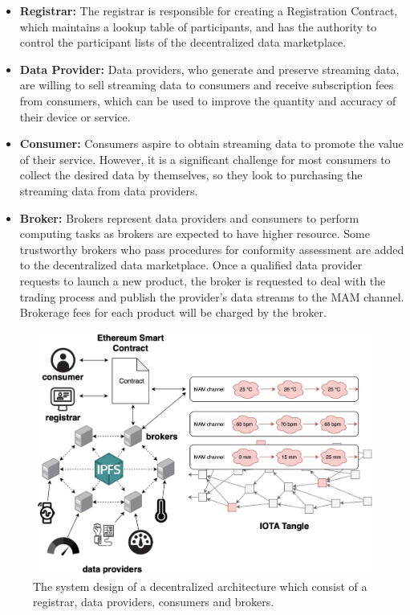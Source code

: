 \documentclass[journal,article,applsci,submit,moreauthors,pdftex]{Definitions/mdpi}
\begin{document}
\begin{itemize}[leftmargin=*,labelsep=5.8mm]
\item \textbf{Registrar: }
The registrar is responsible for creating a Registration Contract, which maintains a lookup table of participants, and has the authority to control the participant lists of the decentralized data marketplace.
\item \textbf{Data Provider: }
Data providers, who generate and preserve streaming data, are willing to sell streaming data to consumers and receive subscription fees from consumers, which can be used to improve the quantity and accuracy of their device or service.
\item \textbf{Consumer: }
Consumers aspire to obtain streaming data to promote the value of their service. However, it is a significant challenge for most consumers to collect the desired data by themselves, so they look to purchasing the streaming data from data providers.
\item \textbf{Broker: }
Brokers represent data providers and consumers to perform computing tasks as brokers are expected to have higher resource. Some trustworthy brokers who pass procedures for conformity assessment are added to the decentralized data marketplace. Once a qualified data provider requests to launch a new product, the broker is requested to deal with the trading process and publish the provider’s data streams to the MAM channel. Brokerage fees for each product will be charged by the broker.
\end{itemize}

\begin{figure}[h]
    \centering
    \includegraphics[width=3.3 in]{system_design}
    \caption{The system design of a decentralized architecture which consist of a registrar, data providers, consumers and brokers.}
    \label{fig:system_design}
\end{figure}
\end{document}
